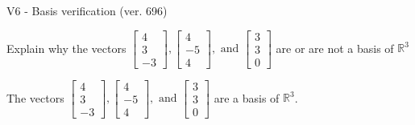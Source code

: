 \begin{exercise}
  \begin{exerciseTitle}V6 - Basis verification (ver. 696)\end{exerciseTitle}
  \begin{exerciseStatement}
    Explain why the vectors \(\left[\begin{array}{r}
4 \\
3 \\
-3
\end{array}\right] , \left[\begin{array}{r}
4 \\
-5 \\
4
\end{array}\right] , \text{ and } \left[\begin{array}{r}
3 \\
3 \\
0
\end{array}\right]\) are or are not a basis of \(\mathbb{R}^3\)	


  \end{exerciseStatement}
  \begin{exerciseAnswer}
   The vectors \(\left[\begin{array}{r}
4 \\
3 \\
-3
\end{array}\right] , \left[\begin{array}{r}
4 \\
-5 \\
4
\end{array}\right] , \text{ and } \left[\begin{array}{r}
3 \\
3 \\
0
\end{array}\right]\) 
  	 are  a basis of \(\mathbb{R}^3\).
  


  \end{exerciseAnswer}
\end{exercise}